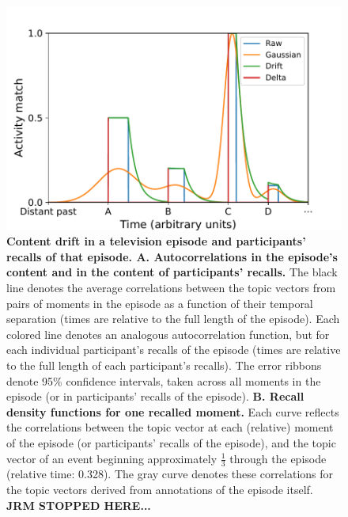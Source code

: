 \documentclass{article}
\begin{document}
\begin{figure}[tp] \centering \includegraphics[width=\textwidth]{figs/reinstatement} \caption{\textbf{Content drift in a television episode and participants' recalls of that episode.  A.  Autocorrelations in the episode's content and in the content of participants' recalls.}  The black line denotes the average correlations between the topic vectors from pairs of moments in the episode as a function of their temporal separation (times are relative to the full length of the episode).  Each colored line denotes an analogous autocorrelation function, but for each individual participant's recalls of the episode (times are relative to the full length of each participant's recalls).  The error ribbons denote 95\% confidence intervals, taken across all moments in the episode (or in participants' recalls of the episode).  \textbf{B. Recall density functions for one recalled moment.} Each curve reflects the correlations between the topic vector at each (relative) moment of the episode (or participants' recalls of the episode), and the topic vector of an event beginning approximately $\frac{1}{3}$ through the episode (relative time: 0.328).  The gray curve denotes these correlations for the topic vectors derived from annotations of the episode itself. \textbf{JRM STOPPED HERE...}}
\label{fig:reinstatement}
\end{figure}
\end{document}
